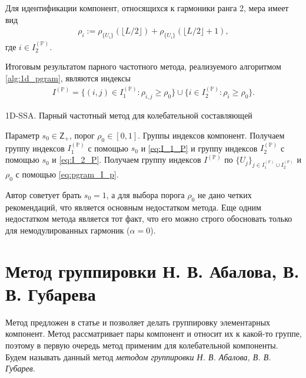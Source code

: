 \documentclass[specialist,
               substylefile = spbu.rtx,
               subf,href,colorlinks=true, 12pt]{disser}
\begin{document}
Для идентификации компонент, относящихся к гармоники ранга 2, мера имеет вид
\begin{gather}\label{eq:rho_i}
\rho_{i} := \rho_{\{U_i\}}(\lfloor L/2 \rfloor) + \rho_{\{U_i\}}(\lfloor L/2 \rfloor + 1),
\end{gather}
где $i \in I_2^{(\mathbb{P})}$.

Итоговым результатом парного частотного метода, реализуемого алгоритмом \ref{alg:1d_pgram}, являются индексы 
\begin{gather} \label{eq:pgram_I_p}
I^{(\mathbb{P})} = \{ (i,j) \in I_1^{(\mathbb{P})}: \rho_{i,j} \geqslant\rho_0 \} \cup \{ i \in I_2^{(\mathbb{P})}: \rho_{i} \geqslant\rho_0 \}.
\end{gather}
 
\begin{algorithm}[!hhh]
\caption{1D-SSA. Парный частотный метод для колебательной составляющей}
\label{alg:1d_pgram}
\begin{algorithmic}[1]
\REQUIRE Параметр $s_0 \in \mathsf{Z}_{+}$, порог $\rho_0 \in [0,1]$.
\ENSURE Группы индексов компонент.
\STATE  Получаем группу индексов $I_1^{(\mathbb{P})}$ с помощью $s_0$ и \eqref{eq:I_1_P} и группу индексов $I_2^{(\mathbb{P})}$ с помощью $s_0$ и \eqref{eq:I_2_P}. 
\STATE Получаем группу индексов $I^{(\mathbb{P})}$ по $\{U_j\}_{j \in I_1^{(\mathbb{P})} \cup I_2^{(\mathbb{P})}}$ и $\rho_0$ с помощью \eqref{eq:pgram_I_p}.
\end{algorithmic}
\end{algorithm}

Автор \cite{Alexandrov2006} советует брать $s_0 = 1$, а для выбора порога $\rho_0$ не дано четких рекомендаций, что является основным недостатком метода. Еще одним недостатком метода является тот факт, что его можно строго обосновать только для немодулированных гармоник ($\alpha = 0$). 

\section{Метод группировки Н. В. Абалова, В. В. Губарева}
Метод предложен в статье \cite{Abalov2015} и позволяет делать группировку элементарных компонент. Метод рассматривает пары компонент и относит их к какой-то группе, поэтому в первую очередь метод применим для колебательной компоненты.    Будем называть данный метод \textit{методом группировки Н. В. Абалова, В. В. Губарев}.
\end{document}
